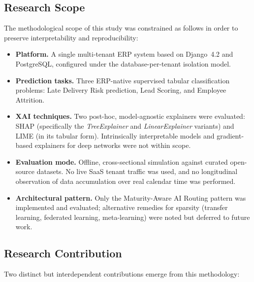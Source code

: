 \subsection{Research Scope}
\label{subsec:meth-scope}

The methodological scope of this study was constrained as follows in order to
preserve interpretability and reproducibility:

\begin{itemize}
    \item \textbf{Platform.} A single multi-tenant ERP system based on
    Django~4.2 and PostgreSQL, configured under the database-per-tenant
    isolation model.
    \item \textbf{Prediction tasks.} Three ERP-native supervised tabular
    classification problems: Late Delivery Risk prediction, Lead Scoring, and
    Employee Attrition.
    \item \textbf{XAI techniques.} Two post-hoc, model-agnostic explainers
    were evaluated: SHAP (specifically the \emph{TreeExplainer} and
    \emph{LinearExplainer} variants) and LIME (in its tabular form).
    Intrinsically interpretable models and gradient-based explainers for deep
    networks were not within scope.
    \item \textbf{Evaluation mode.} Offline, cross-sectional simulation
    against curated open-source datasets. No live SaaS tenant traffic was
    used, and no longitudinal observation of data accumulation over real
    calendar time was performed.
    \item \textbf{Architectural pattern.} Only the Maturity-Aware AI Routing
    pattern was implemented and evaluated; alternative remedies for sparsity
    (transfer learning, federated learning, meta-learning) were noted but
    deferred to future work.
\end{itemize}

\subsection{Research Contribution}
\label{subsec:meth-contribution}

Two distinct but interdependent contributions emerge from this methodology:

